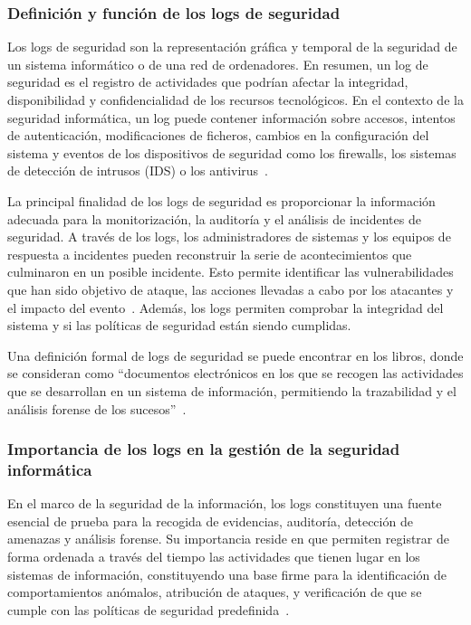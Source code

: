 \subsubsection{Definición y función de los logs de seguridad}
Los logs de seguridad son la representación gráfica y temporal de la seguridad de un sistema informático o de una red de ordenadores. En resumen, un log de seguridad es el registro de actividades que podrían afectar la integridad, disponibilidad y confidencialidad de los recursos tecnológicos. En el contexto de la seguridad informática, un log puede contener información sobre accesos, intentos de autenticación, modificaciones de ficheros, cambios en la configuración del sistema y eventos de los dispositivos de seguridad como los firewalls, los sistemas de detección de intrusos (IDS) o los antivirus~\cite{bishop2003computer}.

La principal finalidad de los logs de seguridad es proporcionar la información adecuada para la monitorización, la auditoría y el análisis de incidentes de seguridad. A través de los logs, los administradores de sistemas y los equipos de respuesta a incidentes pueden reconstruir la serie de acontecimientos que culminaron en un posible incidente. Esto permite identificar las vulnerabilidades que han sido objetivo de ataque, las acciones llevadas a cabo por los atacantes y el impacto del evento~\cite{Landauer2020}. Además, los logs permiten comprobar la integridad del sistema y si las políticas de seguridad están siendo cumplidas.

Una definición formal de logs de seguridad se puede encontrar en los libros, donde se consideran como “documentos electrónicos en los que se recogen las actividades que se desarrollan en un sistema de información, permitiendo la trazabilidad y el análisis forense de los sucesos”~\cite{Landauer2020}.

\subsubsection{Importancia de los logs en la gestión de la seguridad informática}
En el marco de la seguridad de la información, los logs constituyen una fuente esencial de prueba para la recogida de evidencias, auditoría, detección de amenazas y análisis forense. Su importancia reside en que permiten registrar de forma ordenada a través del tiempo las actividades que tienen lugar en los sistemas de información, constituyendo una base firme para la identificación de comportamientos anómalos, atribución de ataques, y verificación de que se cumple con las políticas de seguridad predefinida~\cite{bishop2003computer}.

